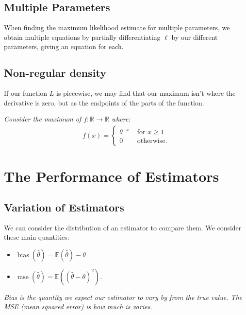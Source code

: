 \documentclass[a4paper, 12pt, twoside]{article}
\DeclareMathOperator{\Mse}{mse}
\DeclareMathOperator{\Bias}{bias}
\begin{document}
\subsection{Multiple Parameters}

When finding the maximum likelihood estimate for multiple parameters, we
obtain multiple equations by partially differentiating $\ell$ by our
different parameters, giving an equation for each.

\subsection{Non-regular density}

If our function $L$ is piecewise, we may find that our maximum isn't where
the derivative is zero, but as the endpoints of the parts of the function.

\vspace{\baselineskip}

\textit{Consider the maximum of $f:\mathbb{R} \to \mathbb{R}$ where:}
\begin{align*}
    f(x) = \begin{cases}
        \theta^{-x} & \text{ for } x \geq 1 \\
        0           & \text{ otherwise.}
    \end{cases}
\end{align*}

\section{The Performance of Estimators}

\subsection{Variation of Estimators}

We can consider the distribution of an estimator to compare them. We
consider these main quantities:

\begin{itemize}
    \item $\Bias(\hat\theta) = \mathbb{E}(\hat\theta) - \theta$
    \item $\Mse(\hat\theta) = \mathbb{E}((\hat\theta - \theta)^2)$.
\end{itemize}

\textit{Bias is the quantity we expect our estimator to vary by from
    the true value. The MSE (mean squared error) is how much is varies.}
\end{document}
